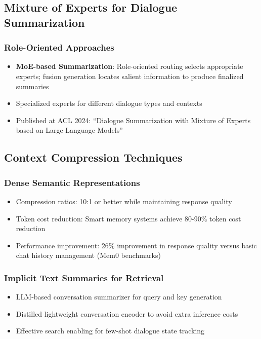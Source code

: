 \documentclass[11pt,letterpaper]{article}
\begin{document}
\subsection{Mixture of Experts for Dialogue Summarization}

\subsubsection{Role-Oriented Approaches}
\begin{itemize}[leftmargin=*]
    \item \textbf{MoE-based Summarization}: Role-oriented routing selects appropriate experts; fusion generation locates salient information to produce finalized summaries
    \item Specialized experts for different dialogue types and contexts
    \item Published at ACL 2024: ``Dialogue Summarization with Mixture of Experts based on Large Language Models''
\end{itemize}

\subsection{Context Compression Techniques}

\subsubsection{Dense Semantic Representations}
\begin{itemize}[leftmargin=*]
    \item Compression ratios: 10:1 or better while maintaining response quality
    \item Token cost reduction: Smart memory systems achieve 80-90\% token cost reduction
    \item Performance improvement: 26\% improvement in response quality versus basic chat history management (Mem0 benchmarks)
\end{itemize}

\subsubsection{Implicit Text Summaries for Retrieval}
\begin{itemize}[leftmargin=*]
    \item LLM-based conversation summarizer for query and key generation
    \item Distilled lightweight conversation encoder to avoid extra inference costs
    \item Effective search enabling for few-shot dialogue state tracking
\end{itemize}
\end{document}
